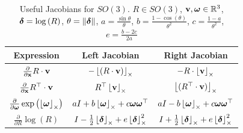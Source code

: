 \begin{table}[ht]
\caption{Useful Jacobians for $SO(3)$.  \newline
		$R\in SO(3)$, $\vbf,\omegabf\in\mathbb{R}^{3}$, \newline
		$\deltabf=\log\left(R\right)$, $\theta=\norm{\deltabf}$, \newline
		$a=\frac{\sin\theta}{\theta}$, $b=\frac{1-\cos\left(\theta\right)}{\theta^{2}}$, $c=\frac{1-a}{\theta^{2}}$, $e=\frac{b-2c}{2a}$
		}
\label{tab:lie_identities_group_vector_s03}
\bgroup
\def\arraystretch{2.0}
\begin{tabular}{ccc}
	\toprule
	Expression & Left Jacobian & Right Jacobian\\
	\midrule
	$\frac{\partial}{\partial\xbf}R\cdot\vbf$ & $-\ss{(R\cdot\vbf)}$ & $-R\cdot\ss{\vbf}$ \\
	$\frac{\partial}{\partial\xbf}R^{\top}\cdot\vbf$ & $R^{\top}\ss{\vbf}$ & $\ss{(R^{\top}\cdot\vbf)}$\\
	$\frac{\partial}{\partial\omegabf}\exp\left(\ss{\omegabf}\right)$ & $aI+b\ss{\omegabf}+c\omegabf\omegabf^{\top}$ & $aI-b\ss{\omegabf}+c\omegabf\omegabf^{\top}$\\
	$\frac{\partial}{\partial R}\log\left(R\right)$ & $I-\frac{1}{2}\ss{\deltabf}+e\ss{\deltabf}^{2}$ & $I+\frac{1}{2}\ss{\deltabf}+e\ss{\deltabf}^{2}$ \\
	\bottomrule
\end{tabular}
\egroup
\end{table}

